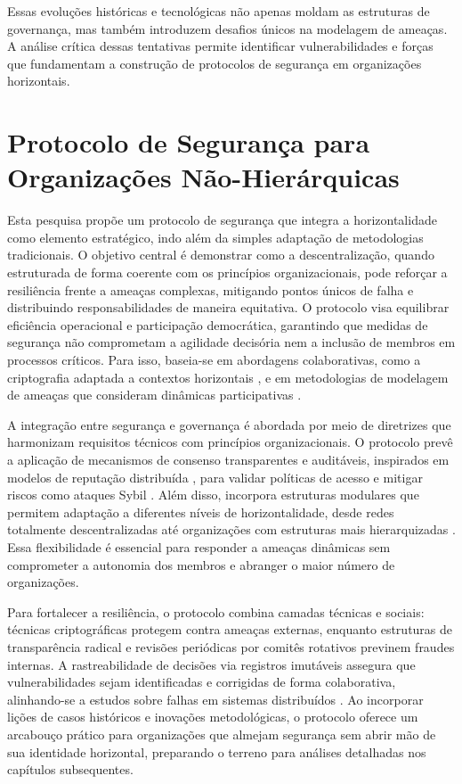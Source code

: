Essas evoluções históricas e tecnológicas não apenas moldam as estruturas
de governança, mas também introduzem desafios únicos na modelagem de
ameaças. A análise crítica dessas tentativas permite identificar
vulnerabilidades e forças que fundamentam a construção de protocolos de
segurança em organizações horizontais.

\section{Protocolo de Segurança para Organizações Não-Hierárquicas}
\label{sec:objetivos_pesquisa}

Esta pesquisa propõe um protocolo de segurança que integra a horizontalidade
como elemento estratégico, indo além da simples adaptação de metodologias
tradicionais. O objetivo central é demonstrar como a descentralização, quando
estruturada de forma coerente com os princípios organizacionais, pode reforçar a
resiliência frente a ameaças complexas, mitigando pontos únicos de falha e
distribuindo responsabilidades de maneira equitativa. O protocolo visa
equilibrar eficiência operacional e participação democrática, garantindo que
medidas de segurança não comprometam a agilidade decisória nem a inclusão de
membros em processos críticos. Para isso, baseia-se em abordagens colaborativas,
como a criptografia adaptada a contextos horizontais \cite{Colbac}, e em
metodologias de modelagem de ameaças que consideram dinâmicas participativas
\cite{ThreatModelingdesigningForSecurity}.

A integração entre segurança e governança é abordada por meio de diretrizes que
harmonizam requisitos técnicos com princípios organizacionais. O protocolo prevê
a aplicação de mecanismos de consenso transparentes e auditáveis, inspirados em
modelos de reputação distribuída \cite{Reputation-basedDAO}, para validar
políticas de acesso e mitigar riscos como ataques Sybil
\cite{MitigationSybilAttack}. Além disso, incorpora estruturas modulares que
permitem adaptação a diferentes níveis de horizontalidade, desde redes
totalmente descentralizadas até organizações com estruturas mais hierarquizadas
\cite{Colbac}. Essa flexibilidade é essencial para responder a ameaças
dinâmicas sem comprometer a autonomia dos membros e abranger o maior número de
organizações.

Para fortalecer a resiliência, o protocolo combina camadas técnicas e sociais:
técnicas criptográficas protegem contra ameaças externas, enquanto
estruturas de transparência radical e revisões periódicas por comitês
rotativos previnem fraudes internas. A rastreabilidade de decisões via
registros imutáveis assegura que vulnerabilidades sejam
identificadas e corrigidas de forma colaborativa, alinhando-se a estudos sobre
falhas em sistemas distribuídos \cite{Reputation-basedDAO}. Ao incorporar lições
de casos históricos e inovações metodológicas, o protocolo oferece um arcabouço
prático para organizações que almejam segurança sem abrir mão de sua identidade
horizontal, preparando o terreno para análises detalhadas nos capítulos
subsequentes.


